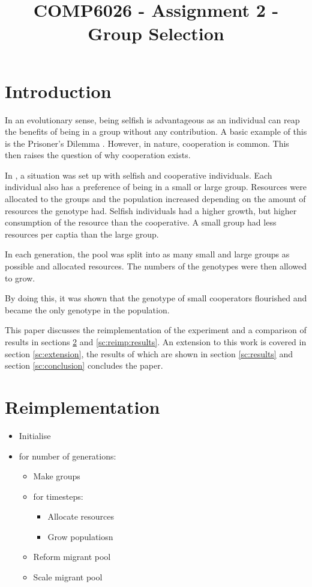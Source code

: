 \documentclass[11pt]{ecsarticle}
\title{COMP6026 - Assignment 2 - Group Selection}
\begin{document}
\maketitle
 
\section{Introduction}

In an evolutionary sense, being selfish is advantageous \cite{} as an individual can reap the benefits of being in a group without any contribution.
A basic example of this is the Prisoner's Dilemma \cite{}.
However, in nature, cooperation is common. 
This then raises the question of why cooperation exists. 

In \cite{powers2007individual}, a situation was set up with selfish and cooperative individuals.
Each individual also has a preference of being in a small or large group. 
Resources were allocated to the groups and the population increased depending on the amount of resources the genotype had. 
Selfish individuals had a higher growth, but higher consumption of the resource than the cooperative.
A small group had less resources per captia than the large group.

In each generation, the pool was split into as many small and large groups as possible and allocated resources.
The numbers of the genotypes were then allowed to grow. 

By doing this, it was shown that the genotype of small cooperators flourished and became the only genotype in the population. 



This paper discusses the reimplementation of the experiment \cite{powers2007individual} and a comparison of results in sections \ref{sc:reimplementation} and \ref{sc:reimp:results}.
An extension to this work is covered in section \ref{sc:extension}, the results of which are shown in section \ref{sc:results} and section \ref{sc:conclusion} concludes the paper.


\section{Reimplementation}\label{sc:reimplementation}
\begin{itemize}
 \item Initialise
 \item for number of generations:
 \begin{itemize}
  \item Make groups
  \item for timesteps:
  \begin{itemize}
   \item Allocate resources
   \item Grow populatiosn
  \end{itemize}
  \item Reform migrant pool
  \item Scale migrant pool
 \end{itemize}

\end{itemize}
\end{document}
